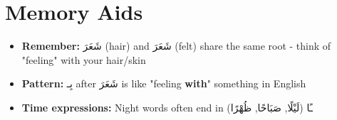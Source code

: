 \documentclass[a4paper,12pt]{article}
\begin{document}
\section{Memory Aids}

\begin{itemize}
\item \textbf{Remember:} \textarabic{شَعَرَ} (hair) and \textarabic{شَعَرَ} (felt) share the same root - think of "feeling" with your hair/skin
\item \textbf{Pattern:} \textarabic{بِـ} after \textarabic{شَعَرَ} is like "feeling \textbf{with}" something in English
\item \textbf{Time expressions:} Night words often end in \textarabic{ـًا} (\textarabic{لَيْلًا}, \textarabic{صَبَاحًا}, \textarabic{ظُهْرًا})
\end{itemize}
\end{document}
